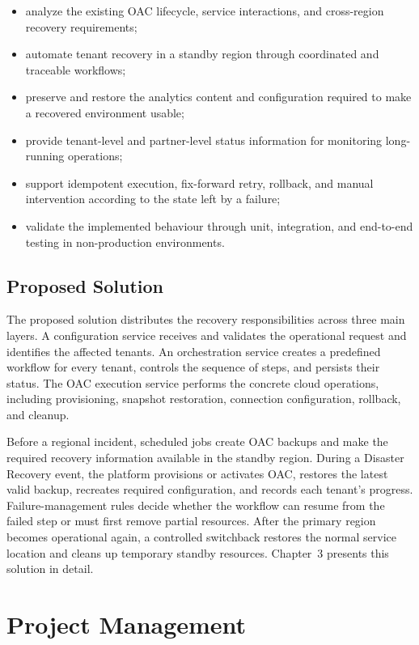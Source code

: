 \begin{itemize}
    \item analyze the existing OAC lifecycle, service interactions, and
    cross-region recovery requirements;
    \item automate tenant recovery in a standby region through coordinated and
    traceable workflows;
    \item preserve and restore the analytics content and configuration required
    to make a recovered environment usable;
    \item provide tenant-level and partner-level status information for
    monitoring long-running operations;
    \item support idempotent execution, fix-forward retry, rollback, and manual
    intervention according to the state left by a failure;
    \item validate the implemented behaviour through unit, integration, and
    end-to-end testing in non-production environments.
\end{itemize}

\subsection{Proposed Solution}

The proposed solution distributes the recovery responsibilities across three
main layers. A configuration service receives and validates the operational
request and identifies the affected tenants. An orchestration service creates a
predefined workflow for every tenant, controls the sequence of steps, and
persists their status. The OAC execution service performs the concrete cloud
operations, including provisioning, snapshot restoration, connection
configuration, rollback, and cleanup.

Before a regional incident, scheduled jobs create OAC backups and make the
required recovery information available in the standby region. During a
Disaster Recovery event, the platform provisions or activates OAC, restores the
latest valid backup, recreates required configuration, and records each
tenant's progress. Failure-management rules decide whether the workflow can
resume from the failed step or must first remove partial resources. After the
primary region becomes operational again, a controlled switchback restores the
normal service location and cleans up temporary standby resources. Chapter~3
presents this solution in detail.

\section{Project Management}

